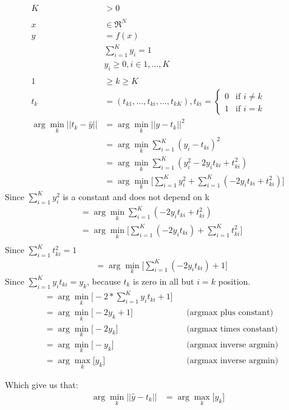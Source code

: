 \documentclass[10pt,a4paper]{article}
\begin{document}
	\begin{align*}
		K &> 0\\
		\\
		x &\in \Re^N\\
		y &= f(x)\\
		&	\sum_{i=1}^{K}{y_i} = 1\\
		&	y_i \ge 0, i \in {1,...,K}\\
		\\
		1 &\ge k \ge K\\
		t_k &= (t_{k1},...,t_{ki},...,t_{kK}), t_{ki} = \begin{cases}
			0 &\mbox{if } i \neq k\\
			1 &\mbox{if } i = k
		\end{cases}
		\\
		\arg\min_k||t_k - \hat{y}|| &= \arg\min_k||y-t_k||^2\\
		&= \arg\min_k\sum_{i=1}^{K}{(y_i-t_{ki})}^2\\
		&= \arg\min_k\sum_{i=1}^{K}{(y_{i}^2-2y_{i}t_{ki}+t_{ki}^2)}\\
		&= \arg\min_k\big[\sum_{i=1}^{K}{y_{i}^2}+\sum_{i=1}^{K}{(-2y_{i}t_{ki}+t_{ki}^2)}\big]
	\end{align*}
	Since $\sum_{i=1}^{K}{y_{i}^2}$ is a constant and does not depend on k
	\begin{align*}
		&= \arg\min_k \sum_{i=1}^{K}{(-2y_{i}t_{ki}+t_{ki}^2)}\\
		&= \arg\min_k\big[\sum_{i=1}^{K}{(-2y_{i}t_{ki})}+\sum_{i=1}^{K}{t_{ki}^2}\big]\\
	\end{align*}
	Since $\sum_{i=1}^{K}{t_{ki}^2} = 1$
	\begin{align*}
		&= \arg\min_k\big[\sum_{i=1}^{K}{(-2y_{i}t_{ki})}+1\big]
	\end{align*}
	Since $\sum_{i=1}^{K}{y_{i}t_{ki}} = y_k$, because $t_k$ is zero in all but $i=k$ position.
	\begin{align*}
		&= \arg\min_k\big[-2*\sum_{i=1}^{K}{y_{i}t_{ki}}+1\big]\\
		&= \arg\min_k\big[-2y_k+1\big] &&\mbox{(argmax plus constant)}\\
		&= \arg\min_k\big[-2y_k\big] &&\mbox{(argmax times constant)}\\
		&= \arg\min_k\big[-y_k\big] &&\mbox{(argmax inverse argmin)}\\
		&= \arg\max_k\big[y_k\big] &&\mbox{(argmax inverse argmin)}
	\end{align*}
	
	Which give us that:
	\begin{align*}
		\arg\min_k ||\hat{y}-t_k|| &= \arg\max_k\big[y_k\big]
	\end{align*}
	
\end{document}
